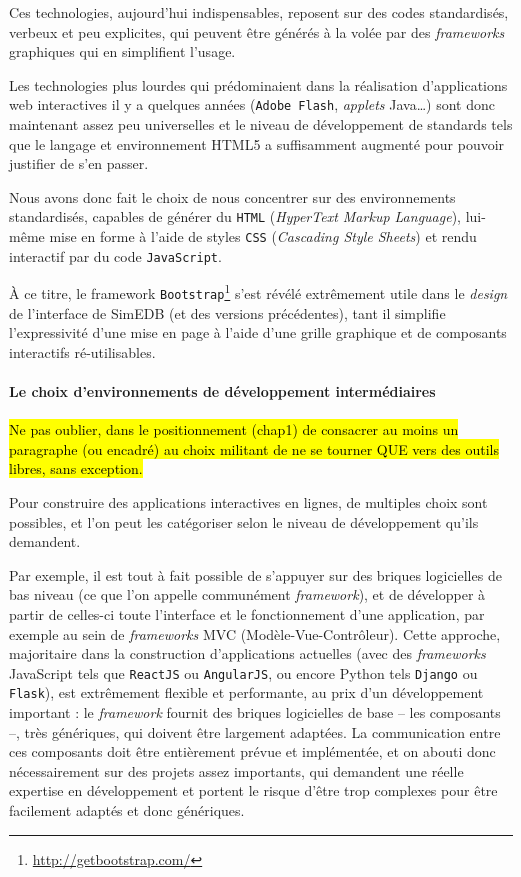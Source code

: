 Ces technologies, aujourd'hui indispensables, reposent sur des codes standardisés, verbeux et peu explicites, qui peuvent être générés à la volée par des \textit{frameworks} graphiques qui en simplifient l'usage.

Les technologies plus lourdes qui prédominaient dans la réalisation d'applications web interactives il y a quelques années (\texttt{Adobe Flash}, \textit{applets} Java\ldots) sont donc maintenant assez peu universelles et le niveau de développement de standards tels que le langage et environnement HTML5 a suffisamment augmenté pour pouvoir justifier de s'en passer.

Nous avons donc fait le choix de nous concentrer sur des environnements standardisés, capables de générer du \texttt{HTML} (\og \textit{HyperText Markup Language}\fg{}), lui-même mise en forme à l'aide de styles \texttt{CSS} (\og \textit{Cascading Style Sheets}\fg{}) et rendu interactif par du code \texttt{JavaScript}.

À ce titre, le framework \texttt{Bootstrap}\footnote{\href{http://getbootstrap.com/}{http://getbootstrap.com/}} s'est révélé extrêmement utile dans le \textit{design} de l'interface de SimEDB (et des versions précédentes), tant il simplifie l'expressivité d'une mise en page à l'aide d'une grille graphique et de composants interactifs ré-utilisables.

\paragraph*{Le choix d'environnements de développement intermédiaires}

\hl{Ne pas oublier, dans le positionnement (chap1) de consacrer au moins un paragraphe (ou encadré) au choix \og militant\fg{} de ne se tourner QUE vers des outils libres, sans exception.}

Pour construire des applications interactives en lignes, de multiples choix sont possibles, et l'on peut les catégoriser selon le niveau de développement qu'ils demandent.

Par exemple, il est tout à fait possible de s'appuyer sur des briques logicielles de bas niveau (ce que l'on appelle communément \textit{framework}), et de développer à partir de celles-ci toute l'interface et le fonctionnement d'une application, par exemple au sein de \textit{frameworks} \og MVC\fg{} (Modèle-Vue-Contrôleur).
Cette approche, majoritaire dans la construction d'applications actuelles (avec des \textit{frameworks} JavaScript tels que \texttt{ReactJS} ou \texttt{AngularJS}, ou encore Python tels \texttt{Django} ou \texttt{Flask}), est extrêmement flexible et performante, au prix d'un développement important : le \textit{framework} fournit des \og briques\fg{} logicielles de base -- les composants --, très génériques, qui doivent être largement adaptées.
La communication entre ces composants doit être entièrement prévue et implémentée, et on abouti donc nécessairement sur des projets assez importants, qui demandent une réelle expertise en développement et portent le risque d'être trop complexes pour être facilement adaptés et donc génériques.

